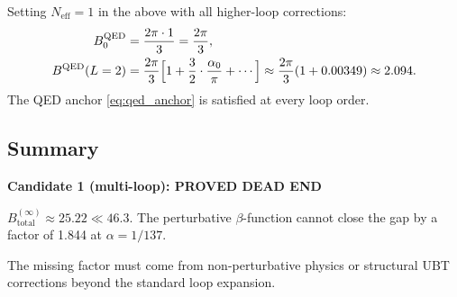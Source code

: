 \documentclass[11pt,a4paper]{article}
\theoremstyle{remark}
\begin{document}
Setting $N_{\mathrm{eff}} = 1$ in the above with all higher-loop corrections:
\begin{align}
  B_0^{\mathrm{QED}} &= \frac{2\pi \cdot 1}{3} = \frac{2\pi}{3}, \label{eq:B0_qed_check}\\
  B^{\mathrm{QED}}(L=2) &= \frac{2\pi}{3}\Bigl[1 + \frac{3}{2}\cdot\frac{\alpha_0}{\pi} + \cdots\Bigr]
    \approx \frac{2\pi}{3}(1 + 0.00349) \approx 2.094. \label{eq:B_qed_twoloop}
\end{align}
The QED anchor \eqref{eq:qed_anchor} is satisfied at every loop order. \checkmark

\subsection{Summary}

\begin{center}
\textbf{Candidate 1 (multi-loop): PROVED DEAD END}

$B_{\mathrm{total}}^{(\infty)} \approx 25.22 \ll 46.3$. The perturbative $\beta$-function
cannot close the gap by a factor of 1.844 at $\alpha = 1/137$.

The missing factor must come from non-perturbative physics or structural UBT corrections
beyond the standard loop expansion.
\end{center}

\ifdefined\INCLUDEMODE\else
\end{document}
